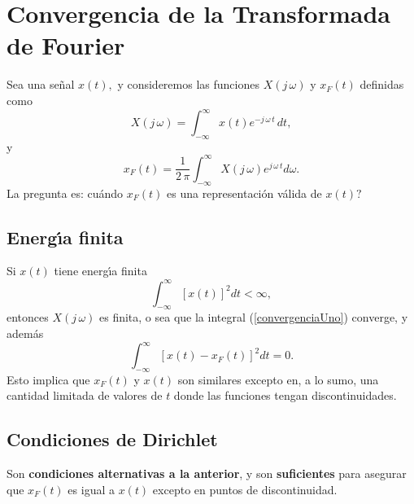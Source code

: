 \section{Convergencia de la Transformada de Fourier}

Sea una se\~{n}al $x\left( t\right) ,$ y consideremos las funciones $X\left(j \, \omega \right) $ y 
$x_{F}\left( t\right) $ definidas como 
\begin{equation}
X\left( j \, \omega \right) =
        \int_{-\infty }^{\infty }x\left( t\right) e^{-j \, \omega \, t} \, dt,  \label{convergenciaUno}
\end{equation}
y 
\begin{equation}
x_{F}\left( t\right) =
        \frac{1}{2 \, \pi }\int_{-\infty }^{\infty }X\left(j \, \omega \right) e^{j \, \omega \, t}d\omega .
\end{equation}
La pregunta es: \textquestiondown cu\'{a}ndo $x_{F}\left( t\right) $ es una representaci\'{o}n 
v\'{a}lida de $x\left( t\right) ?$

\subsection{Energ\'{\i}a finita}

Si $x\left( t\right) $ tiene energ\'{\i}a finita 
\begin{equation}
        \int_{-\infty }^{\infty }\left[ x\left( t\right) \right] ^{2}dt<\infty ,
\end{equation}
entonces $X\left( j \, \omega \right) $ es finita, o sea que la integral (\ref{convergenciaUno}) converge, y 
adem\'{a}s 
\begin{equation}
        \int_{-\infty }^{\infty }\left[ x\left( t\right) -x_{F}\left( t\right) \right] ^{2}dt=0.
\end{equation}
Esto implica que $x_{F}\left( t\right) $ y $x\left( t\right)$ son similares excepto en, a lo sumo, una cantidad limitada de valores de $t$ donde las funciones tengan discontinuidades.

\subsection{Condiciones de Dirichlet}

Son \textbf{condiciones alternativas a la anterior}, y son \textbf{suficientes} para asegurar que 
$x_{F}\left( t\right) $ es igual a $x\left(t\right) $ excepto en puntos de discontinuidad.


